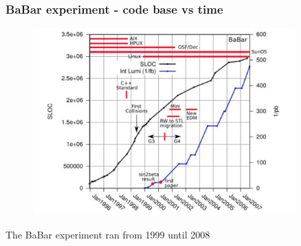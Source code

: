 \begin{frame}
\frametitle{BaBar experiment - code base vs time}

\begin{figure}[htbp]
\begin{center}
\includegraphics[width=0.9\textwidth]{images/babar-sloc-vs-time.png}
\end{center}
\end{figure}

\begin{center}
\small{The BaBar experiment ran from 1999 until 2008}
\end{center}

\end{frame}


